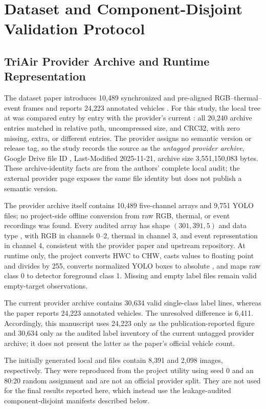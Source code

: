 \section{Dataset and Component-Disjoint Validation Protocol}
\subsection{TriAir Provider Archive and Runtime Representation}
The dataset paper introduces 10,489 synchronized and pre-aligned RGB--thermal--event frames and reports 24,223 annotated vehicles \cite{iaboni2026trimodal}. For this study, the local tree at  was compared entry by entry with the provider's current : all 20,240 archive entries matched in relative path, uncompressed size, and CRC32, with zero missing, extra, or different entries. The provider assigns no semantic version or release tag, so the study records the source as the \emph{untagged provider archive}, Google Drive file ID , Last-Modified 2025-11-21, archive size 3,551,150,083 bytes. These archive-identity facts are from the authors' complete local audit; the external provider page exposes the same file identity but does not publish a semantic version.

The provider archive itself contains 10,489 five-channel  arrays and 9,751 YOLO  files; no project-side offline conversion from raw RGB, thermal, or event recordings was found. Every audited array has shape $(301,391,5)$ and data type , with RGB in channels 0--2, thermal in channel 3, and event representation in channel 4, consistent with the provider paper and upstream repository. At runtime only, the project converts HWC to CHW, casts  values to floating point and divides by 255, converts normalized YOLO boxes to absolute , and maps raw class 0 to detector foreground class 1. Missing and empty label files remain valid empty-target observations.

The current provider archive contains 30,634 valid single-class label lines, whereas the paper reports 24,223 annotated vehicles. The unresolved difference is 6,411. Accordingly, this manuscript uses 24,223 only as the publication-reported figure and 30,634 only as the audited label inventory of the current untagged provider archive; it does not present the latter as the paper's official vehicle count.

The initially generated local  and  files contain 8,391 and 2,098 images, respectively. They were reproduced from the project utility using seed 0 and an 80:20 random assignment and are not an official provider split. They are not used for the final results reported here, which instead use the leakage-audited component-disjoint manifests described below.

